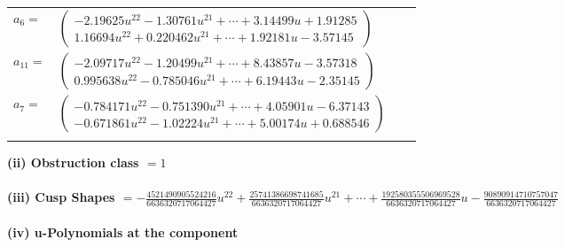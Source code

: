 \documentclass[1p]{elsarticle_modified}
\theoremstyle{definition}
\begin{document}
\begin{tabular}{m{7pt} m{180pt} m{7pt} m{180pt} }
\flushright $a_{6}=$&$\begin{pmatrix}-2.19625 u^{22}-1.30761 u^{21}+\cdots+3.14499 u+1.91285\\1.16694 u^{22}+0.220462 u^{21}+\cdots+1.92181 u-3.57145\end{pmatrix}$ \\
\flushright $a_{11}=$&$\begin{pmatrix}-2.09717 u^{22}-1.20499 u^{21}+\cdots+8.43857 u-3.57318\\0.995638 u^{22}-0.785046 u^{21}+\cdots+6.19443 u-2.35145\end{pmatrix}$ \\
\flushright $a_{7}=$&$\begin{pmatrix}-0.784171 u^{22}-0.751390 u^{21}+\cdots+4.05901 u-6.37143\\-0.671861 u^{22}-1.02224 u^{21}+\cdots+5.00174 u+0.688546\end{pmatrix}$\\&\end{tabular}
\flushleft \textbf{(ii) Obstruction class $= 1$}\\~\\
\flushleft \textbf{(iii) Cusp Shapes $= -\frac{4521490905524216}{6636320717064427} u^{22}+\frac{25741386698741685}{6636320717064427} u^{21}+\cdots+\frac{192580355506969528}{6636320717064427} u-\frac{90890914710757047}{6636320717064427}$}\\~\\
\newpage\renewcommand{\arraystretch}{1}
\flushleft \textbf{(iv) u-Polynomials at the component}\newline \\
\end{document}
